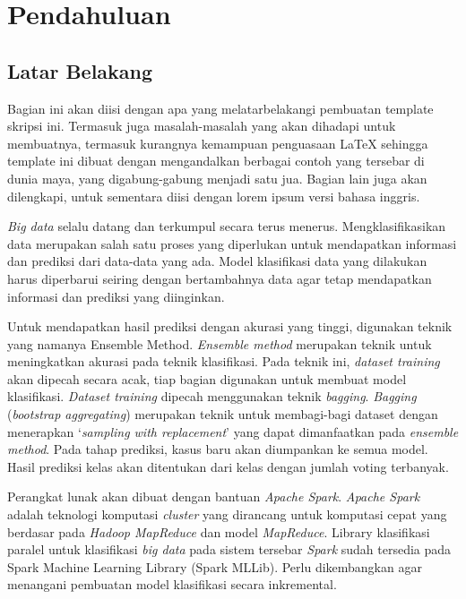 \chapter{Pendahuluan}
\label{chap:intro}
   
\section{Latar Belakang}
\label{sec:label}

Bagian ini akan diisi dengan apa yang melatarbelakangi pembuatan template skripsi ini.
Termasuk juga masalah-masalah yang akan dihadapi untuk membuatnya, termasuk kurangnya kemampuan penguasaan \LaTeX{} sehingga template ini dibuat dengan mengandalkan berbagai contoh yang tersebar di dunia maya, yang digabung-gabung menjadi satu jua.
Bagian lain juga akan dilengkapi, untuk sementara diisi dengan lorem ipsum versi bahasa inggris.

\textit{Big data} selalu datang dan terkumpul secara terus menerus. Mengklasifikasikan data merupakan salah satu proses yang diperlukan untuk mendapatkan informasi dan prediksi dari data-data yang ada. Model klasifikasi data yang dilakukan harus diperbarui seiring dengan bertambahnya data agar tetap mendapatkan informasi dan prediksi yang diinginkan.

Untuk mendapatkan hasil prediksi dengan akurasi yang tinggi, digunakan teknik yang namanya Ensemble Method. \textit{Ensemble method} merupakan teknik untuk meningkatkan akurasi pada teknik klasifikasi. Pada teknik ini, \textit{dataset training} akan dipecah secara acak, tiap bagian digunakan untuk membuat model klasifikasi. \textit{Dataset training} dipecah menggunakan teknik \textit{bagging}. \textit{Bagging} (\textit{bootstrap aggregating}) merupakan teknik untuk membagi-bagi dataset dengan menerapkan ‘\textit{sampling with replacement}’ yang dapat dimanfaatkan pada \textit{ensemble method}. Pada tahap prediksi, kasus baru akan diumpankan ke semua model. Hasil prediksi kelas akan ditentukan dari kelas dengan jumlah voting terbanyak.

Perangkat lunak akan dibuat dengan bantuan \textit{Apache Spark}. \textit{Apache Spark} adalah teknologi komputasi \textit{cluster} yang dirancang untuk komputasi cepat yang berdasar pada \textit{Hadoop MapReduce}  dan model \textit{MapReduce}. Library klasifikasi paralel untuk klasifikasi \textit{big data} pada sistem tersebar \textit{Spark} sudah tersedia pada Spark Machine Learning Library (Spark MLLib). Perlu dikembangkan agar menangani pembuatan model klasifikasi secara inkremental.

